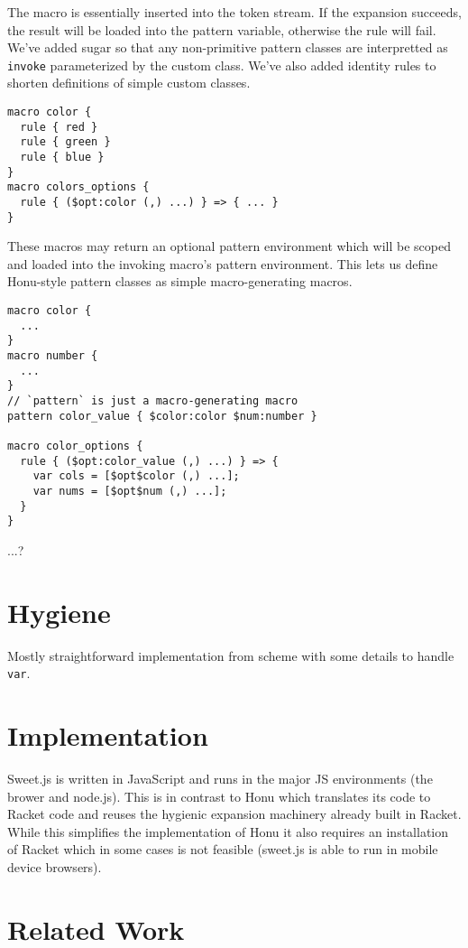 \documentclass[preprint,10pt]{sigplanconf}
\begin{document}
The macro is essentially inserted into the token stream. If the
expansion succeeds, the result will be loaded into the pattern
variable, otherwise the rule will fail. We've added sugar so that any
non-primitive pattern classes are interpretted as \verb!invoke!
parameterized by the custom class. We've also added identity rules to
shorten definitions of simple custom classes.

\begin{verbatim}
macro color {
  rule { red }
  rule { green }
  rule { blue }
}
macro colors_options {
  rule { ($opt:color (,) ...) } => { ... }
}
\end{verbatim}

These macros may return an optional pattern environment which will be
scoped and loaded into the invoking macro's pattern environment. This
lets us define Honu-style pattern classes as simple macro-generating
macros.

\begin{verbatim}
macro color {
  ...
}
macro number {
  ...
}
// `pattern` is just a macro-generating macro
pattern color_value { $color:color $num:number }

macro color_options {
  rule { ($opt:color_value (,) ...) } => {
    var cols = [$opt$color (,) ...];
    var nums = [$opt$num (,) ...];
  }
}

\end{verbatim}

...?

\section{Hygiene}
\label{sec-5}

Mostly straightforward implementation from scheme with some details to
handle \texttt{var}.
\section{Implementation}
\label{sec-6}
Sweet.js is written in JavaScript and runs in the major JS
environments (\ie the brower and node.js). This is in contrast to Honu
which translates its code to Racket code and reuses the hygienic
expansion machinery already built in Racket. While this simplifies
the implementation of Honu it also requires an installation of Racket
which in some cases is not feasible (\eg sweet.js is able to run in
mobile device browsers).
\section{Related Work}
\label{sec-7}
\end{document}
